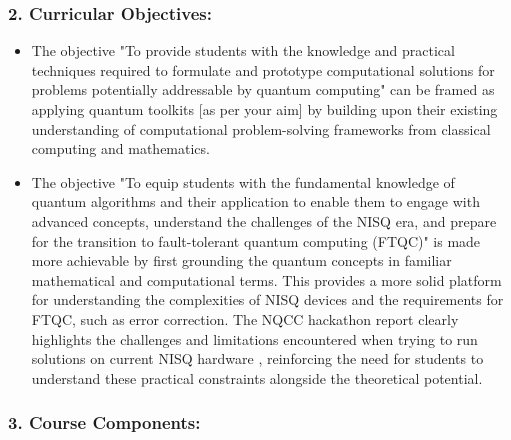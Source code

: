 \documentclass[11pt,a4paper]{article}
\begin{document}
\subsubsection{2. Curricular Objectives:}

\begin{itemize}	

\item The objective "To provide students with the knowledge and practical techniques required to formulate and prototype computational solutions for problems potentially addressable by quantum computing"
can be framed as applying quantum toolkits [as per your aim] by building upon their existing understanding of computational problem-solving frameworks from classical computing and mathematics.

\item The objective "To equip students with the fundamental knowledge of quantum algorithms and their application to enable them to engage with advanced concepts, understand the challenges of the NISQ era, and prepare for the transition to fault-tolerant quantum computing (FTQC)"
is made more achievable by first grounding the quantum concepts in familiar mathematical and computational terms. This provides a more solid platform for understanding the complexities of NISQ devices and the requirements for FTQC, such as error correction. The NQCC hackathon report clearly highlights the challenges and limitations encountered when trying to run solutions on current NISQ hardware
, reinforcing the need for students to understand these practical constraints alongside the theoretical potential.

\end{itemize}	

\subsubsection{3. Course Components:}
\end{document}
